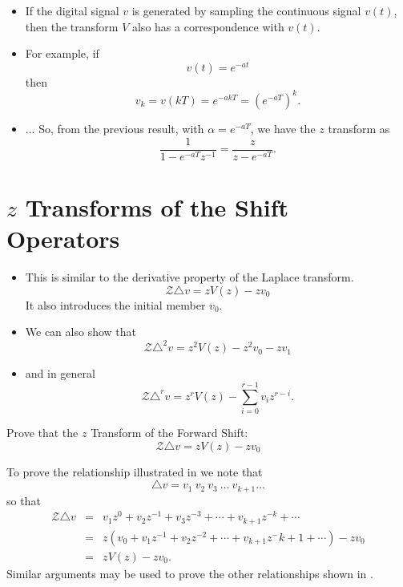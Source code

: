 \begin{slide}\label{slide:l8s1c}

\begin{itemize}

\item If the digital signal $v$ is generated by sampling the continuous
signal $v(t)$, then the transform $V$ also has a correspondence
with $v(t)$.

\item For example, if \[v(t) = e^{-at}\] then \[v_k = v(kT)
= e^{-akT} = (e^{-aT})^k.\]

\item $\ldots$ So, from the previous result, with
$\alpha=e^{-aT}$, we have the $z$ transform as
\[\frac{1}{1-e^{-aT}z^{-1}}=\frac{z}{z-e^{-aT}}.\]

\end{itemize}

\end{slide}

\section*{$z$ Transforms of the Shift Operators}

\begin{slide}

\begin{itemize}
\item  This is similar to the derivative property of the Laplace
  transform.
 \[\mathcal{Z}\triangle v = z V(z) - zv_0\] It also introduces the initial member $v_0$.

\item  We can also show that
  \[\mathcal{Z}\triangle^2 v = z^2 V(z) - z^2 v_0 - z v_1\]
\item and in general
  \[\mathcal{Z}\triangle^r v = z^r V(z) - \sum_{i=0}^{r-1} v_i z^{r-i}.\]

\end{itemize}

\end{slide}

\begin{slide}\label{slide:l8s2}
 Prove that the $z$ Transform of the Forward Shift:
 \[\mathcal{Z}\triangle v = z V(z) - zv_0\]
 \end{slide}
To prove the relationship illustrated in  we note
that
\[\triangle v = v_1\ v_2\ v_3\ \ldots\ v_{k+1}\ldots\]
so that
\begin{eqnarray*}
  \mathcal{Z}\triangle v & = & v_1 z^0 + v_2 z^{-1} + v_3 z^{-3} + \cdots
  + v_{k+1}z^{-k}+\cdots \\
& = & z(v_0 + v_1 z^{-1} + v_2 z^{-2} + \cdots
  + v_{k+1}z^-{k+1}+\cdots)-zv_0\\
&=& zV(z) - zv_0.
\end{eqnarray*}
Similar arguments may be used to prove the other relationships
shown in .

